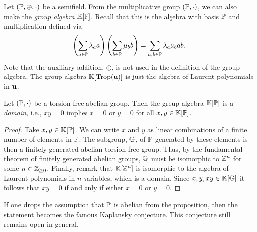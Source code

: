 Let $(\mathbb{P}, \oplus, \cdot)$ be a semifield. From the multiplicative group $(\mathbb{P},
	\cdot)$, we can also make the \emph{group algebra} $\mathbb{K}[\mathbb{P}]$.
Recall that this is the algebra with basis $\mathbb{P}$ and multiplication defined via
\begin{equation*}
	\left(\sum_{a \in \mathbb{P}} \lambda_a a\right)\left(\sum_{b \in \mathbb{P}}\mu_b b\right) = \sum_{a,b \in \mathbb{P}} \lambda_a \mu_b ab.
\end{equation*}
%
Note that the auxiliary addition, $\oplus$, is not used in the definition of the group
algebra. The group algebra $\mathbb{K}[\operatorname{Trop}(\mathbf{u})]$ is just the algebra of Laurent
polynomials in $\mathbf{u}$.
\begin{proposition}

	Let $(\mathbb{P}, \cdot)$ be a torsion-free abelian group. Then the group algebra
	$\mathbb{K}[\mathbb{P}]$ is a \emph{domain}, i.e., $x y = 0$ implies $x = 0$ or $y =
		0$ for all $x,y \in \mathbb{K}[\mathbb{P}]$.
\end{proposition}
\begin{proof}

	Take $x,y \in \mathbb{K}[\mathbb{P}]$. We can write $x$ and $y$ as linear combinations of a finite
	number of elements in $\mathbb{P}$. The subgroup, $\mathbb{G}$, of $\mathbb{P}$ generated by these
	elements is then a finitely generated abelian torsion-free group. Thus, by the
	fundamental theorem of finitely generated abelian groups, $\mathbb{G}$ must be isomorphic to
	$\mathbb{Z}^n$ for some $n \in \mathbb{Z}_{\geq 0}$. Finally, remark that $\mathbb{K}[\mathbb{Z}^n]$ is
	isomorphic to the algebra of Laurent polynomials in $n$ variables, which is a domain.
	Since $x,y,xy \in \mathbb{K}[\mathbb{G}]$ it follows that $xy = 0$ if and only if either $x = 0$ or
	$y = 0$.
\end{proof}

\begin{remark}

	If one drops the assumption that $\mathbb{P}$ is abelian from the proposition, then the
	statement becomes the famous Kaplansky conjecture. This
	conjecture still remains open in general.
\end{remark}

